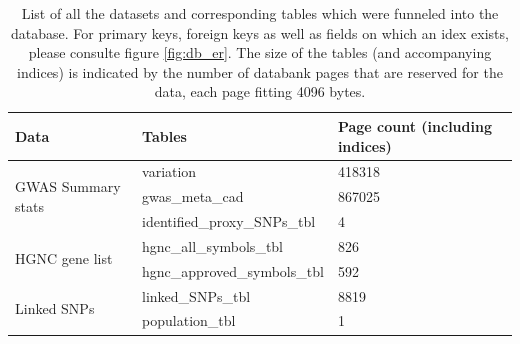     \begin{table}[h!]
    \capstart
    \centering
    \begin{minipage}{\captionwidth}
        \caption[db tables]{\newline
    List of all the datasets and corresponding tables which were funneled into the database. For primary keys, foreign keys as well as fields on which an idex exists, please consulte figure \ref{fig:db_er}. The size of the tables (and accompanying indices) is indicated by the number of databank pages that are reserved for the data, each page fitting 4096 bytes.}
        \label{tab:db_tables}
    \end{minipage}
        \begin{tabular}{l|l|l}
        Data                                       & Tables                             & Page count (including indices)                                                                      \\ \hline
        \multirow{3}{*}{GWAS Summary stats}        & variation                          & 418318                                                                                              \\
                                                   & gwas\_meta\_cad                    & 867025                                                                                              \\
                                                   & identified\_proxy\_SNPs\_tbl       & 4                                                                                                   \\ \hline
        \multirow{2}{*}{HGNC gene list}            & hgnc\_all\_symbols\_tbl            & 826                                                                                                 \\
                                                   & hgnc\_approved\_symbols\_tbl       & 592                                                                                                 \\ \hline
        \multirow{3}{*}{Linked SNPs}               & linked\_SNPs\_tbl                  & 8819                                                                                                \\
                                                   & population\_tbl                    & 1                                                                                                   \\

\end{tabular}
\end{table}
